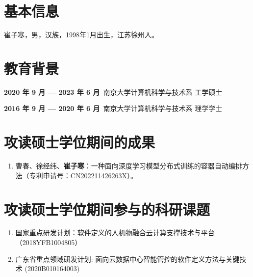 \section*{基本信息}
\noindent 崔子寒，男，汉族，1998年1月出生，江苏徐州人。

\section*{教育背景}

\noindent \textbf{2020 年 9 月 — 2023 年 6 月}~南京大学计算机科学与技术系 \hfill 工学硕士

\noindent \textbf{2016 年 9 月 — 2020 年 6 月}~南京大学计算机科学与技术系 \hfill 理学学士

\section*{攻读硕士学位期间的成果}
\begin{enumerate}[label=\arabic*., labelindent=0em, leftmargin=*]
    \item 曹春、徐经纬、\textbf{崔子寒}：一种面向深度学习模型分布式训练的容器自动编排方法（专利申请号：CN202211426263X）。
\end{enumerate}

\section*{攻读硕士学位期间参与的科研课题}
\begin{enumerate}[label=\arabic*., labelindent=0em, leftmargin=*]
    \item 国家重点研发计划：软件定义的人机物融合云计算支撑技术与平台（2018YFB1004805）
    \item 广东省重点领域研发计划: 面向云数据中心智能管控的软件定义方法与关键技术 (2020B010164003)
    
\end{enumerate}